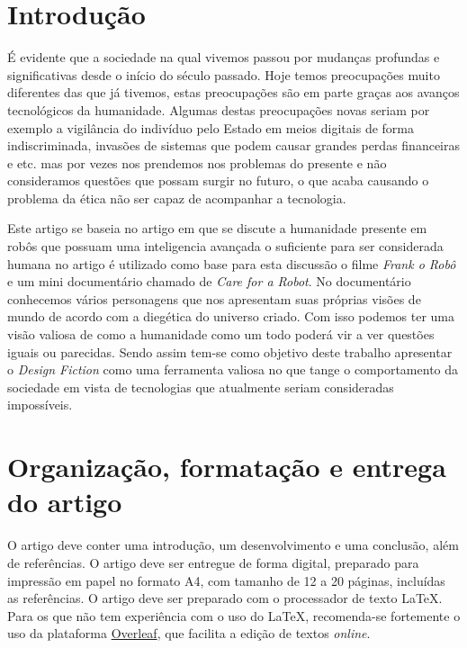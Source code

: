 \documentclass[12pt]{article}
\begin{document}
	\section{Introdução}
	\par É evidente que a sociedade na qual vivemos passou por mudanças profundas e significativas desde o início do século passado. Hoje temos preocupações muito diferentes das que já tivemos, estas preocupações são em parte graças aos avanços tecnológicos da humanidade. Algumas destas preocupações novas seriam por exemplo a vigilância do indivíduo pelo Estado em meios digitais de forma indiscriminada, invasões de sistemas que podem causar grandes perdas financeiras e etc. mas por vezes nos prendemos nos problemas do presente e não consideramos questões que possam surgir no futuro, o que acaba causando o problema da ética não ser capaz de acompanhar a tecnologia.
	\par
	Este artigo se baseia no artigo \cite{lindley_operationalising_2016} em que se discute a humanidade presente em robôs que possuam uma inteligencia avançada o suficiente para ser considerada humana no artigo é utilizado como base para esta discussão o filme \textit{Frank o Robô} e um mini documentário chamado de  \textit{Care for a Robot}. No documentário conhecemos vários personagens que nos apresentam suas próprias visões de mundo de acordo com a diegética do universo criado. Com isso podemos ter uma visão valiosa de como a humanidade como um todo poderá vir a ver questões iguais ou parecidas. Sendo assim tem-se como objetivo deste trabalho apresentar o \textit{Design Fiction} como uma ferramenta valiosa no que tange o comportamento da sociedade em vista de tecnologias que atualmente seriam consideradas impossíveis.


	\section{\label{organizacao:artigo}Organização, formatação e entrega do artigo}

	O artigo deve conter uma introdução, um desenvolvimento e uma conclusão, além de referências.
	O artigo deve ser entregue de forma digital, preparado para impressão em papel no formato A4, com tamanho de 12 a 20 páginas, incluídas as referências.
	O artigo deve ser preparado com o processador de texto \LaTeX.
	Para os que não tem experiência com o uso do \LaTeX, recomenda-se fortemente o uso da plataforma \href{http://www.overleaf.com}{Overleaf}, que facilita a edição de textos \textit{online}.
\end{document}
